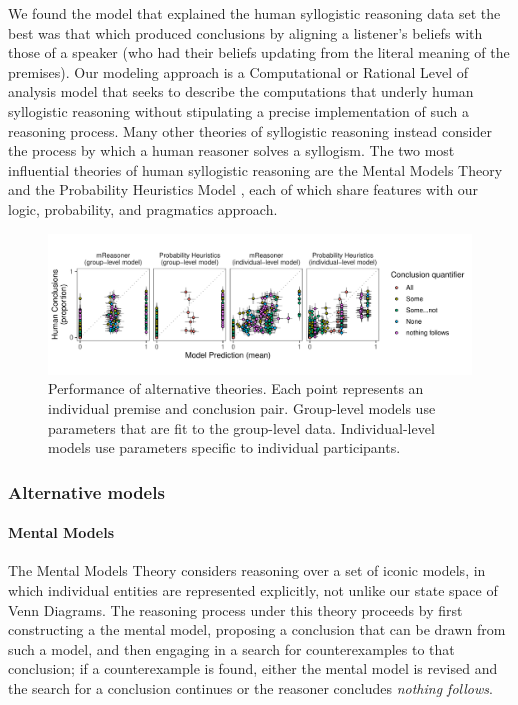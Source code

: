 \documentclass[floatsintext, doc]{apa6}
\begin{document}
We found the model that explained the human syllogistic reasoning data set the best was that which produced conclusions by aligning a listener's beliefs with those of a speaker (who had their beliefs updating from the literal meaning of the premises).
Our modeling approach is a Computational or Rational Level of analysis model \cite{marr1982vision, anderson1990adaptive} that seeks to describe the computations that underly human syllogistic reasoning without stipulating a precise implementation of such a reasoning process. 
Many other theories of syllogistic reasoning instead consider the process by which a human reasoner solves a syllogism.
The two most influential theories of human syllogistic reasoning are the Mental Models Theory \cite{johnsonlaird2006we, khemlani2013processes} and the Probability Heuristics Model \cite{Chater1999}, each of which share features with our logic, probability, and pragmatics approach. 


\begin{figure}[t]
\centering
\includegraphics[width = \textwidth]{figs/alternative_model_scatters.pdf}
\caption{Performance of alternative theories. Each point represents an individual premise and conclusion pair. Group-level models use parameters that are fit to the group-level data. Individual-level models use parameters specific to individual participants. }
\label{fig:altModels}
\end{figure}

\subsubsection{Alternative models}

\paragraph{Mental Models}

The Mental Models Theory considers reasoning over a set of iconic models, in which individual entities are represented explicitly, not unlike our state space of Venn Diagrams. 
The reasoning process under this theory proceeds by first constructing a the mental model, proposing a conclusion that can be drawn from such a model, and then engaging in a search for counterexamples to that conclusion; if a counterexample is found, either the mental model is revised and the search for a conclusion continues or the reasoner concludes \emph{nothing follows}. 
\end{document}
